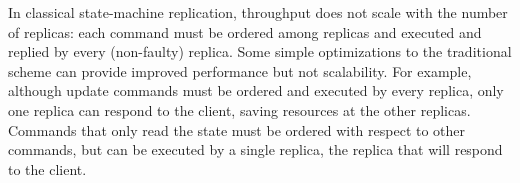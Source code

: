 \documentclass[10pt, conference, compsocconf, letterpaper]{IEEEtranv17}
\begin{document}


In classical state-machine replication, throughput does not scale with the number of replicas: each command must be ordered among replicas and executed and replied by every (non-faulty) replica.
Some simple optimizations to the traditional scheme can provide improved performance but not scalability.
For example, although update commands must be ordered and executed by every replica, only one replica can respond to the client, saving resources at the other replicas.
Commands that only read the state must be ordered with respect to other commands, but can be executed by a single replica, the replica that will respond to the client.

%
%
\end{document}

